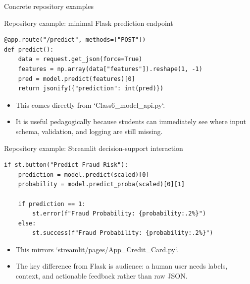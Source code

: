 \begin{frame}{Concrete repository examples}
\coursefooter
\end{frame}

\begin{frame}[fragile]{Repository example: minimal Flask prediction endpoint}
\begin{lstlisting}[style=coursepython]
@app.route("/predict", methods=["POST"])
def predict():
    data = request.get_json(force=True)
    features = np.array(data["features"]).reshape(1, -1)
    pred = model.predict(features)[0]
    return jsonify({"prediction": int(pred)})
\end{lstlisting}
\begin{itemize}
\item This comes directly from `Class6_model_api.py`.
\item It is useful pedagogically because students can immediately see where input schema, validation, and logging are still missing.
\end{itemize}
\coursefooter
\end{frame}

\begin{frame}[fragile]{Repository example: Streamlit decision-support interaction}
\begin{lstlisting}[style=coursepython]
if st.button("Predict Fraud Risk"):
    prediction = model.predict(scaled)[0]
    probability = model.predict_proba(scaled)[0][1]

    if prediction == 1:
        st.error(f"Fraud Probability: {probability:.2%}")
    else:
        st.success(f"Fraud Probability: {probability:.2%}")
\end{lstlisting}
\begin{itemize}
\item This mirrors `streamlit/pages/App_Credit_Card.py`.
\item The key difference from Flask is audience: a human user needs labels, context, and actionable feedback rather than raw JSON.
\end{itemize}
\coursefooter
\end{frame}

